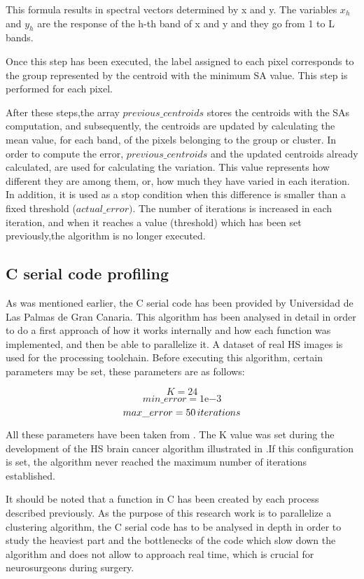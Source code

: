  	This formula results in spectral vectors determined by x and y. The variables $x_h$ and $y_h$ are the response of the h-th band of x and y and they go from 1 to L bands.
  
  Once this step has been executed, the label assigned to each pixel corresponds to the group represented by the centroid with the minimum SA value. This step is performed for each pixel. 

After these steps,the array $previous\_centroids$ stores the centroids with the SAs computation, and subsequently, the centroids are updated by calculating the mean value, for each band, of the pixels belonging to the group or cluster. In order to compute the error, $previous\_centroids$ and the updated centroids already calculated, are used for calculating the variation. This value represents how different they are among them, or, how much they have varied in each iteration. In addition, it is used as a stop condition when this difference is smaller than a fixed threshold ($actual\_error)$. The number of iterations is increased in each iteration, and when it reaches a value (threshold) which has been set previously,the algorithm is no longer executed. 

     \subsection{C serial code profiling}
     
	As was mentioned earlier, the C serial code has been provided by Universidad de Las Palmas de Gran Canaria.  This algorithm has been analysed in detail in order to do a  first approach of how it works internally and how each function was implemented, and then be able to parallelize it. A dataset of real HS images is used for the processing toolchain. Before executing this algorithm, certain parameters may be set, these parameters are as follows:
	
	$$K=24$$
	$$min\_error=1\mathrm{e}{-3}$$
	$$max\_error=50 \thinspace iterations$$
	
	All these parameters have been taken from \cite{torti2018paralle}. The K value was set during the development of the HS brain cancer algorithm illustrated in \cite{fabelo2018spatio}.If this configuration is set, the algorithm never reached the maximum number of iterations established.
	
	It should be noted that a function in C has been created by each process described previously. As the purpose of this research work is to parallelize a clustering algorithm, the C serial code has to be analysed in depth in order to study the heaviest part and the bottlenecks of the code which slow down the algorithm and does not allow to approach real time, which is crucial for neurosurgeons during surgery.
	
